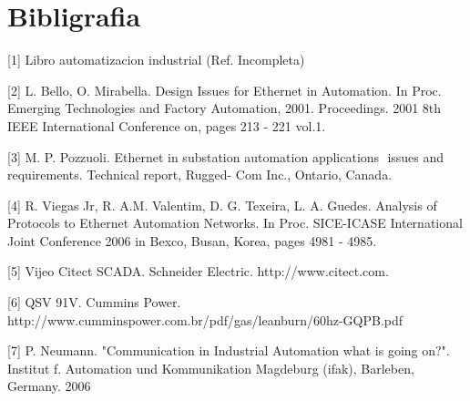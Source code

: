 
\section{Bibligrafia}
[1] Libro automatizacion industrial (Ref. Incompleta)

[2] L. Bello, O. Mirabella. Design Issues for Ethernet in Automation. In Proc.
Emerging Technologies and Factory Automation, 2001. Proceedings. 2001 8th IEEE 
International Conference on, pages 213 - 221 vol.1.

[3] M. P. Pozzuoli. Ethernet in substation automation applications
 issues and requirements. Technical report, Rugged-
Com Inc., Ontario, Canada.

[4] R. Viegas Jr, R. A.M. Valentim, D. G. Texeira, L. A. Guedes. Analysis of Protocols 
to Ethernet Automation Networks. In Proc. SICE-ICASE International Joint Conference 2006
in Bexco, Busan, Korea, pages 4981 - 4985.

[5] Vijeo Citect SCADA. Schneider Electric. http://www.citect.com.

[6] QSV 91V. Cummins Power. http://www.cumminspower.com.br/pdf/gas/leanburn/60hz-GQPB.pdf

[7] P. Neumann. "Communication in Industrial Automation what is going on?". Institut f. 
Automation und Kommunikation Magdeburg (ifak), Barleben, Germany. 2006

